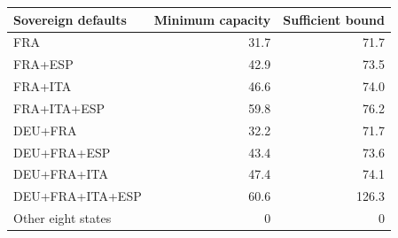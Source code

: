 \begin{tabular*}{\textwidth}{@{\extracolsep{\fill}}lrr@{}}
\toprule
Sovereign defaults & Minimum capacity & Sufficient bound \\
\midrule
FRA & 31.7 & 71.7 \\
FRA+ESP & 42.9 & 73.5 \\
FRA+ITA & 46.6 & 74.0 \\
FRA+ITA+ESP & 59.8 & 76.2 \\
DEU+FRA & 32.2 & 71.7 \\
DEU+FRA+ESP & 43.4 & 73.6 \\
DEU+FRA+ITA & 47.4 & 74.1 \\
DEU+FRA+ITA+ESP & 60.6 & 126.3 \\
\midrule
Other eight states & 0 & 0 \\
\bottomrule
\end{tabular*}
